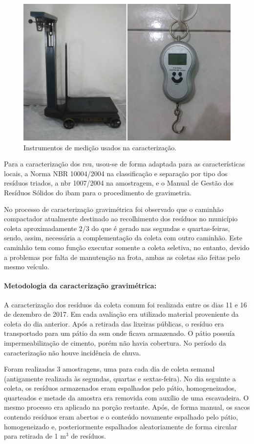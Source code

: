 \begin{figure}
	\centering
	\includegraphics[width=0.7\linewidth]{produtos/prodtres/image021_22}
	\caption{Instrumentos de medição usados na caracterização.}
	\label{fig:image021_22}
\end{figure}


Para a caracterização dos \gls{rsu}, usou-se de forma adaptada para as características locais, a Norma NBR 10004/2004 na classificação e separação por tipo dos resíduos triados, a \gls{nbr} 1007/2004 na amostragem, e o Manual de Gestão dos Resíduos Sólidos do \gls{ibam} para o procedimento de gravimetria.

No processo de caracterização gravimétrica foi observado que o caminhão compactador atualmente destinado ao recolhimento dos resíduos no município coleta aproximadamente 2/3 do que é gerado nas segundas e quartas-feiras, sendo, assim, necessária a complementação da coleta com outro caminhão. Este caminhão tem como função executar somente a coleta seletiva, no entanto, devido a problemas por falta de manutenção na frota, ambas as coletas são feitas pelo mesmo veículo.

\paragraph{\textbf{Metodologia da caracterização gravimétrica:}}

A caracterização dos resíduos da coleta comum foi realizada entre os dias 11 e 16 de dezembro de 2017. Em cada avaliação era utilizado material proveniente da coleta do dia anterior. Após a retirada das lixeiras públicas, o resíduo era transportado para um pátio da \gls{ssm} onde ficava armazenado. O pátio possuía impermeabilização de cimento, porém não havia cobertura. No período da caracterização não houve incidência de chuva.

Foram realizadas 3 amostragens, uma para cada dia de coleta semanal (antigamente realizada às segundas, quartas e sextas-feira). No dia seguinte a coleta, os resíduos armazenados eram espalhados pelo pátio, homogeneizados, quarteados e metade da amostra era removida com auxílio de uma escavadeira. O mesmo processo era aplicado na porção restante. Após, de forma manual, os sacos contendo resíduos eram abertos e o conteúdo novamente espalhado pelo pátio, homogeneizado e, posteriormente espalhados aleatoriamente de forma circular para retirada de 1 m$^{3}$ de resíduos.

